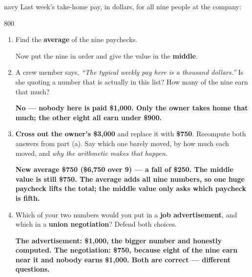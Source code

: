 \documentclass[12pt]{article}
\newcommand{\answerspace}[2]{\par\nopagebreak\noindent\begin{minipage}[t][#1][t]{\linewidth}%
  \color{keyred}\bfseries #2\end{minipage}\par}
\begin{document}
\begin{scenariobox}{navy}
Last week's take-home pay, in dollars, for all nine people at the company:

\vspace{3pt}
\begin{center}
800        
\end{center}
\vspace{2pt}

\begin{center}
\end{center}
\vspace{1pt}

\normalsize
\begin{enumerate}[label=\textbf{\alph*.}, leftmargin=1.8em, itemsep=4pt]
  \item Find the \textbf{average} of the nine paychecks. 

        Now put the nine in order and give the value in the \textbf{middle}. 
  \item A crew member says, \emph{``The typical weekly pay here is a thousand dollars.''} Is she
        quoting a number that is actually in this list? How many of the nine earn that much?
        \answerspace{1.4cm}{No --- nobody here is paid \$1{,}000. Only the owner takes home that
        much; the other eight all earn under \$900.}
  \item \textbf{Cross out the owner's \$3{,}000} and replace it with \textbf{\$750}. Recompute
        both answers from part (a). Say which one barely moved, by how much each moved, and
        \emph{why the arithmetic makes that happen}.
        \answerspace{2.0cm}{New average \$750 (\$6{,}750 over 9) --- a fall of \$250. The middle
        value is still \$750. The average adds all nine numbers, so one huge paycheck lifts the
        total; the middle value only asks which paycheck is fifth.}
  \item Which of your two numbers would you put in a \textbf{job advertisement}, and which in a
        \textbf{union negotiation}? Defend both choices.
        \answerspace{1.6cm}{The advertisement: \$1{,}000, the bigger number and honestly
        computed. The negotiation: \$750, because eight of the nine earn near it and nobody
        earns \$1{,}000. Both are correct --- different questions.}
\end{enumerate}
\end{scenariobox}
\end{document}
